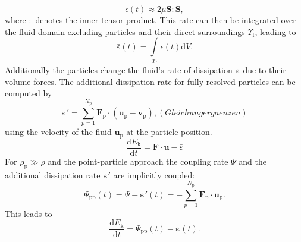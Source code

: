 \documentclass[11pt,a4paper,openany,oneside,parskip=half*]{article}
\renewcommand*\vec[1]{\boldsymbol{#1}}
\begin{document}
\begin{equation}
 \epsilon (t) \approx 2 \mu \vec{\bar{S}}\vec{:}\vec{\bar{S}},
\end{equation}
where $\vec{:}$ denotes the inner tensor product. This rate can then be integrated over the fluid domain excluding particles and their direct surroundings $\Upsilon_\mathrm{f}$, leading to 
\begin{equation}
\bar\varepsilon (t) = \int\limits_{\Upsilon_\mathrm{f}} \epsilon(t) \mathrm{d}V.
\end{equation}
Additionally the particles change the fluid's rate of dissipation $\vec{\varepsilon}$ due to their volume forces. The additional dissipation rate for fully resolved particles can be computed by
\begin{equation}
	\vec{\varepsilon}' = \sum_{p=1}^{N_\mathrm{p}} \vec{F}_\mathrm{p} \cdot (\vec{u}_\mathrm{p}-\vec{v}_\mathrm{p}), (Gleichung ergaenzen)
\end{equation}
using the velocity of the fluid $\vec{u}_\mathrm{p}$ at the particle position.
\begin{equation}
	\frac{\mathrm{d} E_\mathrm{k}}{\mathrm{d} t} = \vec{F} \cdot \vec{u} - \bar{\varepsilon}
\end{equation}
For $\rho_\mathrm{p} \gg \rho$ and the point-particle approach the coupling rate $\Psi$ and the additional dissipation rate $\vec{\varepsilon}'$ are implicitly coupled:
\begin{equation}
\Psi_\mathrm{pp} (t) = \Psi -\vec{\varepsilon}'(t) = - \sum_{p=1}^{N_\mathrm{p}} \vec{F}_\mathrm{p} \cdot \vec{u}_\mathrm{p}.
\end{equation}
This leads to 
\begin{equation}
\frac{\mathrm{d} E_\mathrm{k}}{\mathrm{d} t} = \Psi_\mathrm{pp} (t) - \vec{\varepsilon} (t).
\end{equation}
\newline
\end{document}
